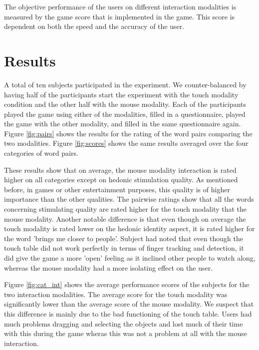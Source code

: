 \documentclass[a4paper,10pt]{report}
\begin{document}
The objective performance of the users on different interaction modalities is measured by the game score that is implemented in the game.
This score is dependent on both the speed and the accuracy of the user.

\chapter{Results}
\label{chap:results}

A total of ten subjects participated in the experiment. We counter-balanced by having half of the participants start the experiment with the touch modality condition and the other half with the mouse modality. Each of the participants played the game using either of the modalities, filled in a questionnaire, played the game with the other modality, and filled in the same questionnaire again. Figure \ref{fig:pairs} shows the results for the rating of the word pairs comparing the two modalities. Figure \ref{fig:scores} shows the same results averaged over the four categories of word pairs. 

These results show that on average, the mouse modality interaction is rated higher on all categories except on hedonic stimulation quality. As mentioned before, in games or other entertainment purposes, this quality is of higher importance than the other qualities. The pairwise ratings show that all the words concerning stimulating quality are rated higher for the touch modality that the mouse modality. Another notable difference is that even though on average the touch modality is rated lower on the hedonic identity aspect, it is rated higher for the word 'brings me closer to people'. Subject had noted that even though the touch table did not work perfectly in terms of finger tracking and detection, it did give the game a more 'open' feeling as it inclined other people to watch along, whereas the mouse modality had a more isolating effect on the user. 

Figure \ref{fig:cat_int} shows the average performance scores of the subjects for the two interaction modalities. The average score for the touch modality was significantly lower than the average score of the mouse modality. We suspect that this difference is mainly due to the bad functioning of the touch table. Users had much problems dragging and selecting the objects and lost much of their time with this during the game wheras this was not a problem at all with the mouse interaction.  
\end{document}
